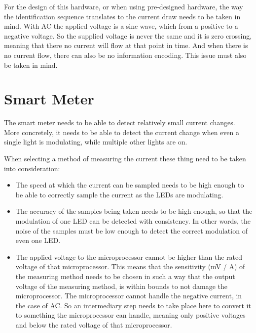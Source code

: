 	For the design of this hardware, or when using pre-designed hardware, the way the identification sequence translates to the current draw needs to be taken in mind. 
	With AC the applied voltage is a sine wave, which from a positive to a negative voltage.
	So the supplied voltage is never the same and it is zero crossing, meaning that there no current will flow at that point in time.
	And when there is no current flow, there can also be no information encoding.
	This issue must also be taken in mind.



	\section{Smart Meter}

	The smart meter needs to be able to detect relatively small current changes.
	More concretely, it needs to be able to detect the current change when even a single light is modulating, while multiple other lights are on.

	When selecting a method of measuring the current these thing need to be taken into consideration:

	\begin{itemize}
		\item The speed at which the current can be sampled needs to be high enough to be able to correctly sample the current as the LEDs are modulating.

		\item The accuracy of the samples being taken needs to be high enough, so that the modulation of one LED can be detected with consistency.
		In other words, the noise of the samples must be low enough to detect the correct modulation of even one LED.

		\item The applied voltage to the microprocessor cannot be higher than the rated voltage of that microprocessor. This means that the sensitivity (mV / A) of the measuring method needs to be chosen in such a way that the output voltage of the measuring method, is within bounds to not damage the microprocessor.
		The microprocessor cannot handle the negative current, in the case of AC. So an intermediary step needs to take place here to convert it to something the microprocessor can handle, meaning only positive voltages and below the rated voltage of that microprocessor.

	\end{itemize}


















